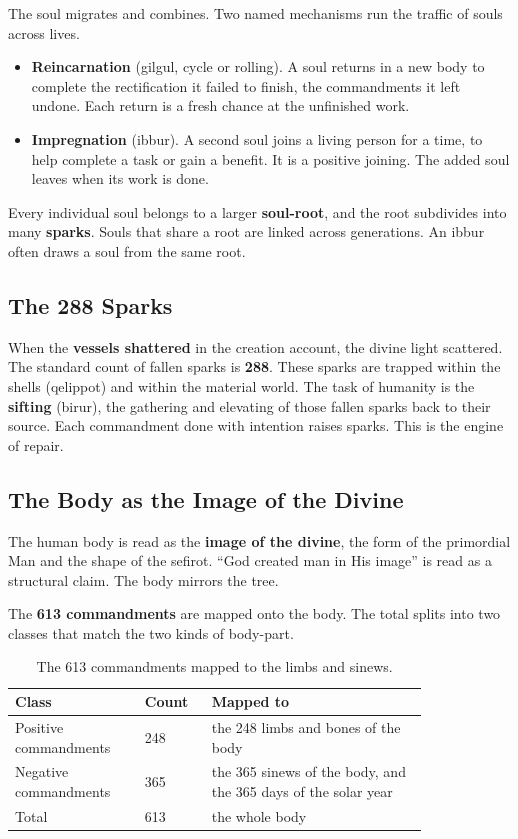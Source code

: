 The soul migrates and combines. Two named mechanisms run the traffic of souls
across lives.

\begin{itemize}
 \item \textbf{Reincarnation} (gilgul, cycle or rolling). A soul returns in a new
 body to complete the rectification it failed to finish, the commandments
 it left undone. Each return is a fresh chance at the unfinished work.
 \item \textbf{Impregnation} (ibbur). A second soul joins a living person for a
 time, to help complete a task or gain a benefit. It is a positive joining.
 The added soul leaves when its work is done.
\end{itemize}

Every individual soul belongs to a larger \textbf{soul-root}, and the root
subdivides into many \textbf{sparks}. Souls that share a root are linked across
generations. An ibbur often draws a soul from the same root.

\subsection{The 288 Sparks}

When the \textbf{vessels shattered} in the creation account, the divine light
scattered. The standard count of fallen sparks is \textbf{288}. These sparks are
trapped within the shells (qelippot) and within the material world. The task of
humanity is the \textbf{sifting} (birur), the gathering and elevating of those fallen
sparks back to their source. Each commandment done with intention raises sparks.
This is the engine of repair.

\subsection{The Body as the Image of the Divine}

The human body is read as the \textbf{image of the divine}, the form of the
primordial Man and the shape of the sefirot. \enquote{God created man in His
image} is read as a structural claim. The body mirrors the tree.

The \textbf{613 commandments} are mapped onto the body. The total splits into two
classes that match the two kinds of body-part.

\begin{longtable}{L{0.26\linewidth} L{0.12\linewidth} L{0.44\linewidth}}
\caption{The 613 commandments mapped to the limbs and sinews.}\\
\toprule
\textbf{Class} & \textbf{Count} & \textbf{Mapped to} \\
\midrule
Positive commandments & 248 & the 248 limbs and bones of the body \\
Negative commandments & 365 & the 365 sinews of the body, and the 365 days of the solar year \\
Total & 613 & the whole body \\
\bottomrule
\end{longtable}

